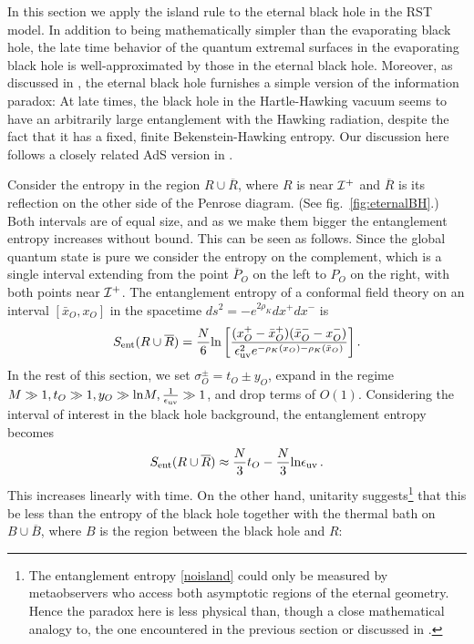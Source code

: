 \documentclass[12pt,oneside,letterpaper]{article}
\newcommand{\f}{\frac}
\newcommand{\be}{\begin{equation}}
\newcommand{\ee}{\end{equation}}
\newcommand{\bx}{\bar{x}}
\def\be{\begin{eqnarray}}
\def\ee{\end{eqnarray}}
\let\f=\frac
\def\be{\begin{equation}}
\def\ee{\end{equation}}
\def\euv{\epsilon_{\rm uv}}
\def\log{{\rm ln}}
\numberwithin{equation}{section}
\def \be {\begin{equation}}
\def \ee {\end{equation}}
\begin{document}
In this section we apply the island rule to the eternal black hole in the RST model. In addition to being mathematically simpler than the evaporating black hole, the late time behavior of the quantum extremal surfaces in the evaporating black hole is well-approximated by those in the eternal black hole. 
Moreover, as discussed in \cite{Fiola:1994ir,Strominger:1993yf,Almheiri:2019yqk}, the eternal black hole furnishes a simple version of the information paradox: At late times, the black hole in the Hartle-Hawking vacuum seems to have an arbitrarily large entanglement with the Hawking radiation, despite the fact that it has a fixed, finite Bekenstein-Hawking entropy.  Our discussion here follows a closely related AdS version in \cite{Almheiri:2019yqk}.


Consider the entropy in the region $R \cup \overline{R}$, where $R$ is near ${\cal I}^+$ and $\overline{R}$ is its reflection on the other side of the Penrose diagram. (See fig.~\ref{fig:eternalBH}.) Both intervals are of equal size, and as we make them bigger the entanglement entropy increases without bound. This can be seen as follows. Since the global quantum state is pure we consider the entropy on the complement, which is a single interval extending from the point $\overline{P}_O$ on the left to $P_O$ on the right, with both points near ${\cal I}^+$.  The entanglement entropy of a conformal field theory on an interval $[\bx_O, x_O]$ in the spacetime $ds^2 = -e^{2\rho_K}dx^+ dx^-$ is 
\be\label{srr1}
S_{\rm ent}({R\cup \overline{R}}) = \f N 6 \log \left[\f{(x_O^+-\bx_O^+)(\bx_O^--x_O^-)}{\euv ^2e^{-\rho_K(x_O)-\rho_K(\bx_O)}}\right].
\ee
 In the rest of this section, we set $\sigma_O^{\pm} = t_O \pm y_O$, expand in the regime $M \gg 1, t_O \gg 1, y_O \gg \log M, {1 \over \euv}\gg 1$, and drop terms of $O(1)$.  Considering the interval of interest in the black hole background, the entanglement entropy becomes \be\label{noisland}
S_{\rm ent}({R\cup \overline{R}}) \approx  
\frac{N}{3}t_O  - \frac{N}{3}\log \epsilon_{\rm uv}\,.
\ee
This increases linearly with time. On the other hand, unitarity suggests\footnote{The entanglement entropy  \eqref{noisland} could only be measured by metaobservers who access both asymptotic regions of the eternal geometry. Hence the paradox here is less physical than, though a close mathematical analogy to, the one encountered in the previous section or discussed in  \cite{Fiola:1994ir,Strominger:1993yf}.} that this be  less than  the entropy of the black hole together with the thermal bath on $B \cup \overline{B}$, where $B$ is the region between the black hole and $R$: 
\end{document}
